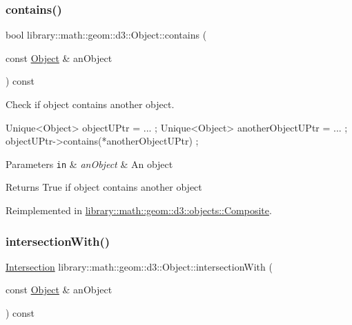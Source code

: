 \subsubsection{\texorpdfstring{contains()}{contains()}}
{\footnotesize\ttfamily bool library\+::math\+::geom\+::d3\+::\+Object\+::contains (\begin{DoxyParamCaption}\item[{const \hyperlink{classlibrary_1_1math_1_1geom_1_1d3_1_1_object}{Object} \&}]{an\+Object }\end{DoxyParamCaption}) const\hspace{0.3cm}{\ttfamily [virtual]}}



Check if object contains another object. 


\begin{DoxyCode}
Unique<Object> objectUPtr = ... ;
Unique<Object> anotherObjectUPtr = ... ;
objectUPtr->contains(*anotherObjectUPtr) ;
\end{DoxyCode}



\begin{DoxyParams}[1]{Parameters}
\mbox{\tt in}  & {\em an\+Object} & An object \\
\hline
\end{DoxyParams}
\begin{DoxyReturn}{Returns}
True if object contains another object 
\end{DoxyReturn}


Reimplemented in \hyperlink{classlibrary_1_1math_1_1geom_1_1d3_1_1objects_1_1_composite_a3ec9ea04f09dea14be1e0f7eaa477c04}{library\+::math\+::geom\+::d3\+::objects\+::\+Composite}.

\mbox{\label{classlibrary_1_1math_1_1geom_1_1d3_1_1_object_a609b1ea1d5f868b004726622efabad5d}} 
\subsubsection{\texorpdfstring{intersection\+With()}{intersectionWith()}}
{\footnotesize\ttfamily \hyperlink{classlibrary_1_1math_1_1geom_1_1d3_1_1_intersection}{Intersection} library\+::math\+::geom\+::d3\+::\+Object\+::intersection\+With (\begin{DoxyParamCaption}\item[{const \hyperlink{classlibrary_1_1math_1_1geom_1_1d3_1_1_object}{Object} \&}]{an\+Object }\end{DoxyParamCaption}) const\hspace{0.3cm}{\ttfamily [virtual]}}



